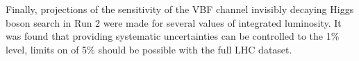 Finally, projections of the sensitivity of the \ac{VBF} channel invisibly decaying Higgs boson search in Run 2 were made for several values of integrated luminosity. It was found that providing systematic uncertainties can be controlled to the 1\% level, limits on \BRinv of 5\% should be possible with the full LHC dataset.
